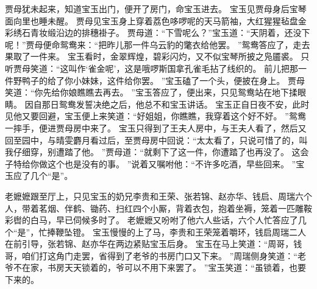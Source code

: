 贾母犹未起来，知道宝玉出门，便开了房门，命宝玉进去。
宝玉见贾母身后宝琴面向里也睡未醒。
贾母见宝玉身上穿着荔色哆啰呢的天马箭袖，大红猩猩毡盘金彩绣石青妆缎沿边的排穗褂子。
贾母道：“下雪呢么？”宝玉道：“天阴着，还没下呢！”贾母便命鸳鸯来：“把昨儿那一件乌云豹的氅衣给他罢。
”鸳鸯答应了，走去果取了一件来。
宝玉看时，金翠辉煌，碧彩闪灼，又不似宝琴所披之凫靥裘。
只听贾母笑道：“这叫作‘雀金呢’，这是哦啰斯国拿孔雀毛拈了线织的。
前儿把那一件野鸭子的给了你小妹妹，这件给你罢。
”宝玉磕了一个头，便披在身上。
贾母笑道：“你先给你娘瞧瞧去再去。
”宝玉答应了，便出来，只见鸳鸯站在地下揉眼睛。
因自那日鸳鸯发誓决绝之后，他总不和宝玉讲话。
宝玉正自日夜不安，此时见他又要回避，宝玉便上来笑道：“好姐姐，你瞧瞧，我穿着这个好不好。
”鸳鸯一摔手，便进贾母房中来了。
宝玉只得到了王夫人房中，与王夫人看了，然后又回至园中，与晴雯麝月看过后，至贾母房中回说：“太太看了，只说可惜了的，叫我仔细穿，别遭踏了他。
”贾母道：“就剩下了这一件，你遭踏了也再没了。
这会子特给你做这个也是没有的事。
”说着又嘱咐他：“不许多吃酒，早些回来。
”宝玉应了几个“是”。
\par
老嬷嬷跟至厅上，只见宝玉的奶兄李贵和王荣、张若锦、赵亦华、钱启、周瑞六个人，带着茗烟、伴鹤、锄药、扫红四个小厮，背着衣包，抱着坐褥，笼着一匹雕鞍彩辔的白马，早已伺候多时了。
老嬷嬷又吩咐了他六人些话，六个人忙答应了几个“是”，忙捧鞭坠镫。
宝玉慢慢的上了马，李贵和王荣笼着嚼环，钱启周瑞二人在前引导，张若锦、赵亦华在两边紧贴宝玉后身。
宝玉在马上笑道：“周哥，钱哥，咱们打这角门走罢，省得到了老爷的书房门口又下来。
”周瑞侧身笑道：“老爷不在家，书房天天锁着的，爷可以不用下来罢了。
”宝玉笑道：“虽锁着，也要下来的。
